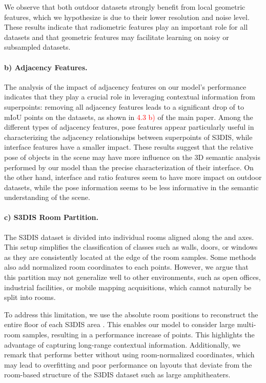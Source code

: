 We observe that both outdoor datasets strongly benefit from local geometric features, which we hypothesize is due to their lower resolution and noise level.
These results indicate that radiometric features play an important role for all datasets and that geometric features may facilitate learning on noisy or subsampled datasets.




\paragraph{b) Adjacency Features.} The analysis of the impact of adjacency features on our model's performance indicates that they play a crucial role in leveraging contextual information from superpoints: removing all adjacency features leads to a significant drop of 
 to  mIoU points on the datasets, as shown in \textcolor{red}{4.3 b)} of the main paper. 
Among the different types of adjacency features, 
pose features appear particularly useful in characterizing the adjacency relationships between superpoints of S3DIS, while interface features have a smaller impact.
These results suggest that the relative pose 
of objects in the scene may have more influence on the 3D semantic analysis performed by our model than the precise characterization of their interface.
On the other hand, interface and ratio features seem to have more impact on outdoor datasets, while the pose information seems to be less informative in the semantic understanding of the scene.

\paragraph{c)  S3DIS Room Partition.} The S3DIS dataset is divided into individual rooms aligned along the  and  axes.
This setup simplifies the classification of classes such as walls, doors, or windows as they are consistently located at the edge of the room samples. Some methods also add normalized room coordinates to each points.
However, we argue that this partition may not generalize well to other environments, such as open offices, industrial facilities, or mobile mapping acquisitions, which cannot naturally be split into rooms.

To address this limitation, we use the absolute room positions to reconstruct the entire floor of each S3DIS area \cite{thomas2019kpconv,chaton2020torch}. This enables our model to consider large multi-room samples, resulting in a performance increase of  points. This highlights the advantage of capturing long-range contextual information.
Additionally, we remark that \SHORTHAND performs better without using room-normalized coordinates, which may lead to overfitting and poor performance on layouts that deviate from the room-based structure of the S3DIS dataset such as large amphitheaters.



